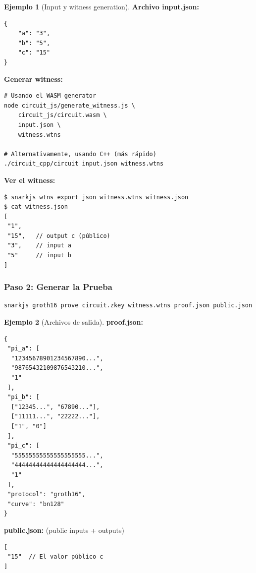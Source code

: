 \documentclass[11pt,a4paper,twoside,openright]{book}
\theoremstyle{definition}
\newtheorem{example}{Ejemplo}[chapter]
\theoremstyle{plain}
\theoremstyle{remark}
\begin{document}
\begin{example}[Input y witness generation]
\textbf{Archivo input.json:}
\begin{verbatim}
{
    "a": "3",
    "b": "5",
    "c": "15"
}
\end{verbatim}

\textbf{Generar witness:}
\begin{verbatim}
# Usando el WASM generator
node circuit_js/generate_witness.js \
    circuit_js/circuit.wasm \
    input.json \
    witness.wtns

# Alternativamente, usando C++ (más rápido)
./circuit_cpp/circuit input.json witness.wtns
\end{verbatim}

\textbf{Ver el witness:}
\begin{verbatim}
$ snarkjs wtns export json witness.wtns witness.json
$ cat witness.json
[
 "1",
 "15",   // output c (público)
 "3",    // input a
 "5"     // input b
]
\end{verbatim}
\end{example}

\subsubsection{Paso 2: Generar la Prueba}

\begin{verbatim}
snarkjs groth16 prove circuit.zkey witness.wtns proof.json public.json
\end{verbatim}

\begin{example}[Archivos de salida]
\textbf{proof.json:}
\begin{verbatim}
{
 "pi_a": [
  "12345678901234567890...",
  "98765432109876543210...",
  "1"
 ],
 "pi_b": [
  ["12345...", "67890..."],
  ["11111...", "22222..."],
  ["1", "0"]
 ],
 "pi_c": [
  "55555555555555555555...",
  "44444444444444444444...",
  "1"
 ],
 "protocol": "groth16",
 "curve": "bn128"
}
\end{verbatim}

\textbf{public.json:} (public inputs + outputs)
\begin{verbatim}
[
 "15"  // El valor público c
]
\end{verbatim}
\end{example}
\end{document}
